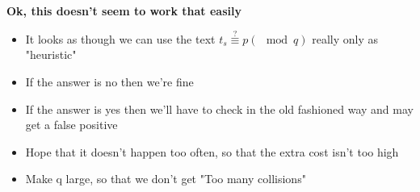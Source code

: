 \documentclass{article}[18pt]
\begin{document}
\textbf{Ok, this doesn't seem to work that easily}
\begin{itemize}
	\item It looks as though we can use the text $t_s\stackrel{?}{\equiv}p(\mod q)$ really only as "heuristic"
	\item If the answer is no then we're fine
	\item If the answer is yes then we'll have to check in the old fashioned way and may get a false positive
	\item Hope that it doesn't happen too often, so that the extra cost isn't too high
	\item Make q large, so that we don't get "Too many collisions"
\end{itemize}
\end{document}
